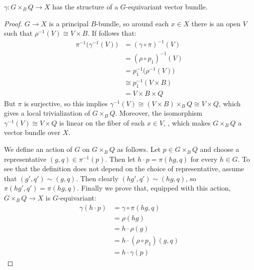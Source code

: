 \begin{proposition}
\label{prop:eqvb}
$\gamma : G\times_B Q \to X$ has the structure of a $G$-equivariant vector bundle.
\end{proposition}
\begin{proof}
$G \to X$ is a principal $B$-bundle, so around each $x \in X$ there is an open $V$ such that $\rho^{-1}(V) \cong
V \times B$.  If follows that:
\begin{align*}
\pi^{-1} \big(\gamma^{-1}(V) \big) &= (\gamma \circ \pi)^{-1}(V) \\
&= (\rho \circ p_1)^{-1}(V) \\
&= p_1^{-1} \big(\rho^{-1}(V) \big) \\
&\cong p_1^{-1} (V \times B) \\
&= V \times B \times Q
\end{align*}
But $\pi$ is surjective, so this implies $\gamma^{-1}(V) \cong (V \times B)\times_B Q \cong V \times Q$, which gives a local
trivialization of $G\times_B Q$. Moreover, the isomorphism $\gamma^{-1}(V) \cong V\times Q$ is linear on the fiber of each
$x \in V$, , which makes $G\times_B Q$
a vector bundle over $X$.

We define an action of $G$ on $G\times_B Q$ as follows. Let $p \in G\times_B Q$ and choose a representative $(g,q) \in \pi^{-1}
(p)$. Then let $h \cdot p = \pi (hg, q)$ for every $h \in G$. To see that the definition does not depend on the choice of
representative, assume that $(g',q') \sim (g,q)$. Then clearly $(hg',q') \sim (hg,q)$, so $\pi(hg',q') = \pi(hg,q)$. Finally
we prove that, equipped with this action, $G\times_B Q \to X$ is $G$-equivariant:
\begin{align*}
\gamma(h \cdot p) &= \gamma \circ \pi (hg, q) \\
&= \rho(hg) \\
&= h \cdot \rho(g) \\
&= h \cdot (\rho \circ p_1)(g,q) \\
&= h \cdot \gamma(p)
\end{align*}
\end{proof}











